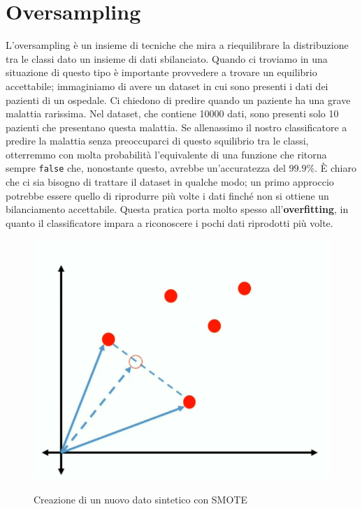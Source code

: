 \documentclass[12pt, twoside, letterpaper]{report}
\begin{document}
	
		\section{Oversampling}
			L'oversampling è un insieme di tecniche che mira a riequilibrare la distribuzione tra le classi dato un insieme di dati sbilanciato. Quando ci troviamo in una situazione di questo tipo è importante provvedere a trovare un equilibrio accettabile; immaginiamo di avere un dataset in cui sono presenti i dati dei pazienti di un ospedale. Ci chiedono di predire quando un paziente ha una grave malattia rarissima. Nel dataset, che contiene 10000 dati, sono presenti solo 10 pazienti che presentano questa malattia. Se allenassimo il nostro classificatore a predire la malattia senza preoccuparci di questo squilibrio tra le classi, otterremmo con molta probabilità l'equivalente di una funzione che ritorna sempre \texttt{false} che, nonostante questo, avrebbe un'accuratezza del $99.9\%$. È chiaro che ci sia bisogno di trattare il dataset in qualche modo; un primo approccio potrebbe essere quello di riprodurre più volte i dati  finché non si ottiene un bilanciamento accettabile. Questa pratica porta molto spesso all'\textbf{overfitting}, in quanto il classificatore impara a riconoscere i pochi dati riprodotti più volte.
						
			\begin{figure}
				\centering
				\includegraphics[scale=0.25]{smote.png}\\
				\caption{Creazione di un nuovo dato sintetico con SMOTE}
				\label{smote_fig}
			\end{figure}
			
\end{document}
